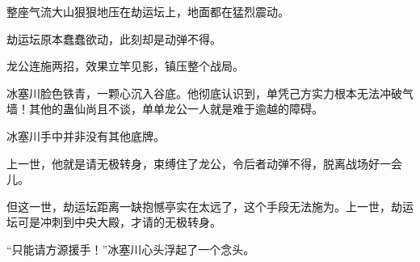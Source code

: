 \begin{this_body}
整座气流大山狠狠地压在劫运坛上，地面都在猛烈震动。

劫运坛原本蠢蠢欲动，此刻却是动弹不得。

龙公连施两招，效果立竿见影，镇压整个战局。

冰塞川脸色铁青，一颗心沉入谷底。他彻底认识到，单凭己方实力根本无法冲破气墙！其他的蛊仙尚且不谈，单单龙公一人就是难于逾越的障碍。

冰塞川手中并非没有其他底牌。

上一世，他就是请无极转身，束缚住了龙公，令后者动弹不得，脱离战场好一会儿。

但这一世，劫运坛距离一缺抱憾亭实在太远了，这个手段无法施为。上一世，劫运坛可是冲刺到中央大殿，才请的无极转身。

“只能请方源援手！”冰塞川心头浮起了一个念头。

\end{this_body}

